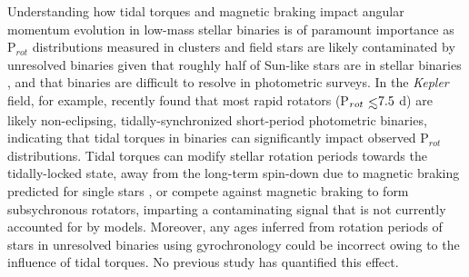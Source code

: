 \documentclass[twocolumn]{aastex61}
\def\lsim{~\rlap{$<$}{\lower 1.0ex\hbox{$\sim$}}}
\newcommand{\kepler}[0]{\textit{Kepler}\xspace}
\begin{document}
 
Understanding how tidal torques and magnetic braking impact angular momentum evolution in low-mass stellar binaries is of paramount importance as P$_{rot}$ distributions measured in clusters \citep[e.g. Praesepe, ][]{Douglas2017} and field stars \citep[e.g. \kepler, ][]{McQuillan2014} are likely contaminated by unresolved binaries given that roughly half of Sun-like stars are in stellar binaries \citep{Raghavan2010,Duchene2013}, and that binaries are difficult to resolve in photometric surveys. In the \kepler field, for example, \citet{Simonian2018} recently found that most rapid rotators (P$_{rot} \lsim 7.5$ d) are likely non-eclipsing, tidally-synchronized short-period photometric binaries, indicating that tidal torques in binaries can significantly impact observed P$_{rot}$ distributions.  Tidal torques can modify stellar rotation periods towards the tidally-locked state, away from the long-term spin-down due to magnetic braking predicted for single stars \citep{Dunn1961,Skumanich1972,Barnes2003}, or compete against magnetic braking to form subsychronous rotators, imparting a contaminating signal that is not currently accounted for by models. Moreover, any ages inferred from rotation periods of stars in unresolved binaries using gyrochronology could be incorrect owing to the influence of tidal torques. No previous study has quantified this effect. 
\end{document}
